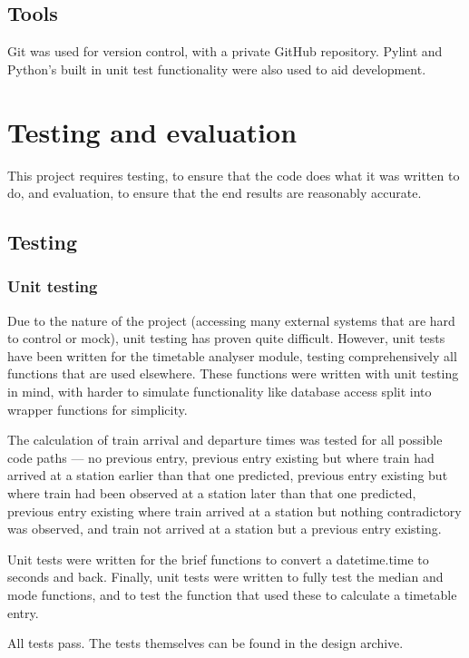 \documentclass[a4paper,12pt,twoside]{report}
\begin{document}
\section{Tools}

Git was used for version control, with a private GitHub repository. Pylint and
Python's built in unit test functionality were also used to aid development.

\chapter{Testing and evaluation}

This project requires testing, to ensure that the code does what it was written
to do, and evaluation, to ensure that the end results are reasonably accurate.

\section{Testing}

\subsection{Unit testing}

Due to the nature of the project (accessing many external systems that are hard
to control or mock), unit testing has proven quite difficult. However, unit
tests have been written for the timetable analyser module, testing
comprehensively all functions that are used elsewhere. These functions were
written with unit testing in mind, with harder to simulate functionality like
database access split into wrapper functions for simplicity.

The calculation of train arrival and departure times was tested for all
possible code paths --- no previous entry, previous entry existing but where
train had arrived at a station earlier than that one predicted, previous entry
existing but where train had been observed at a station later than that one
predicted, previous entry existing where train arrived at a station but nothing
contradictory was observed, and train not arrived at a station but a previous
entry existing.

Unit tests were written for the brief functions to convert a datetime.time to
seconds and back. Finally, unit tests were written to fully test the median and
mode functions, and to test the function that used these to calculate a
timetable entry.

All tests pass. The tests themselves can be found in the design archive.
\end{document}
